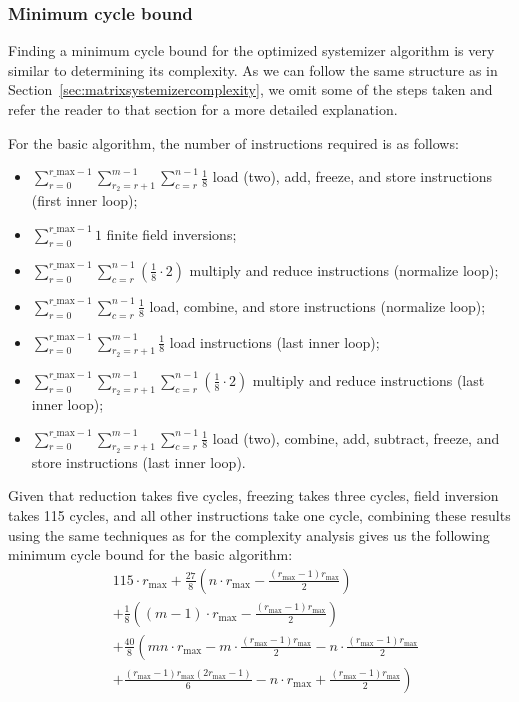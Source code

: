 \documentclass[11pt,a4paper]{report}
\theoremstyle{definition}
\begin{document}
\subsubsection{Minimum cycle bound}
Finding a minimum cycle bound for the optimized systemizer algorithm is very similar to determining its complexity. As we can follow the same structure as in Section~\ref{sec:matrixsystemizercomplexity}, we omit some of the steps taken and refer the reader to that section for a more detailed explanation.

For the basic algorithm, the number of instructions required is as follows:
\begin{itemize}
  \item $\sum_{r=0}^{r\_\text{max}-1} \sum_{r_2=r+1}^{m-1} \sum_{c=r}^{n-1} \frac{1}{8}$ load (two), add, freeze, and store instructions (first inner loop);
  \item $\sum_{r=0}^{r\_\text{max}-1} 1$ finite field inversions;
  \item $\sum_{r=0}^{r\_\text{max}-1} \sum_{c=r}^{n-1} (\frac{1}{8} \cdot 2)$ multiply and reduce instructions (normalize loop);
  \item $\sum_{r=0}^{r\_\text{max}-1} \sum_{c=r}^{n-1} \frac{1}{8}$ load, combine, and store instructions (normalize loop);
  \item $\sum_{r=0}^{r\_\text{max}-1} \sum_{r_2=r+1}^{m-1} \frac{1}{8}$ load instructions (last inner loop);
  \item $\sum_{r=0}^{r\_\text{max}-1} \sum_{r_2=r+1}^{m-1} \sum_{c=r}^{n-1} (\frac{1}{8} \cdot 2)$ multiply and reduce instructions (last inner loop);
  \item $\sum_{r=0}^{r\_\text{max}-1} \sum_{r_2=r+1}^{m-1} \sum_{c=r}^{n-1} \frac{1}{8}$ load (two), combine, add, subtract, freeze, and store instructions (last inner loop).
\end{itemize}

\pagebreak

Given that reduction takes five cycles, freezing takes three cycles, field inversion takes 115 cycles, and all other instructions take one cycle, combining these results using the same techniques as for the complexity analysis gives us the following minimum cycle bound for the basic algorithm:
\begin{align*}
   & 115 \cdot r_\text{max} + \frac{27}{8} \left( n \cdot r_\text{max} - \frac{(r_\text{max} - 1)r_{\text{max}}}{2} \right)                                        \\
   & + \frac{1}{8} \left( (m-1) \cdot r_\text{max} - \frac{(r_\text{max} - 1)r_{\text{max}}}{2} \right)                                                            \\
   & + \frac{40}{8} \left( mn \cdot r_\text{max} - m \cdot \frac{(r_\text{max} - 1)r_{\text{max}}}{2} - n \cdot \frac{(r_\text{max} - 1)r_{\text{max}}}{2} \right. \\
   & \left. + \frac{(r_\text{max} - 1)r_{\text{max}}(2r_{\text{max}} - 1)}{6} - n \cdot r_\text{max} + \frac{(r_\text{max} - 1)r_{\text{max}}}{2} \right)
\end{align*}
\end{document}
